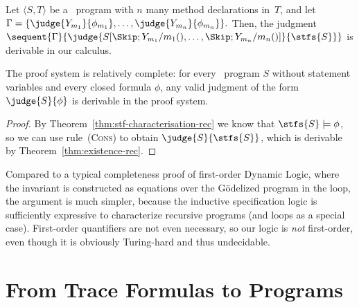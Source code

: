 \documentclass[a4paper,numberwithinsect]{lipics-v2021}
\begin{document}
\begin{theorem}
  \label{thm:existence-rec}
  Let $\langle S, T\rangle$ be a \Rec\ program with $n$ many method
  declarations in~$T$, and let
  $
    \Gamma=\{\judge{Y_{m_1}}{\phi_{m_1}},\ldots,\judge{Y_{m_n}}{\phi_{m_n}}\}.
  $
  Then, the judgment
  $
    \sequent{\Gamma}{\judge{S[\Skip;Y_{m_1}/m_1(),\ldots,\Skip;Y_{m_n}/m_n()]}{\stfs{S}}}
  $
  is derivable in our calculus. %
\end{theorem}

\begin{corollary}
  \label{cor:relative-completeness-rec}
  The proof system is relatively complete: for every \Rec\ program $S$
  without statement variables and every closed formula $\phi$, any
  valid judgment of the form $\judge{S}{\phi}$ is derivable in the
  proof system.
\end{corollary}

\begin{proof}
  By Theorem~\ref{thm:stf-characterisation-rec} we know that
  $\stfs{S}\models\phi$, so we can use rule~(\textsc{Cons}) to obtain
  $\judge{S}{\stfs{S}}$, which is derivable by
  Theorem~\ref{thm:existence-rec}. %
\end{proof}

Compared to a typical completeness proof of first-order Dynamic Logic,
where the invariant is constructed as equations over the G\"{o}delized
program in the loop, the argument is much simpler, because the
inductive specification logic is sufficiently expressive to
characterize recursive programs (and loops as a special case).
%
First-order quantifiers are not even necessary, so our logic
is \emph{not} first-order, even though it is obviously Turing-hard and
thus undecidable.


\section{From Trace Formulas to Programs}
\label{sec:canonical-programs}
\end{document}
